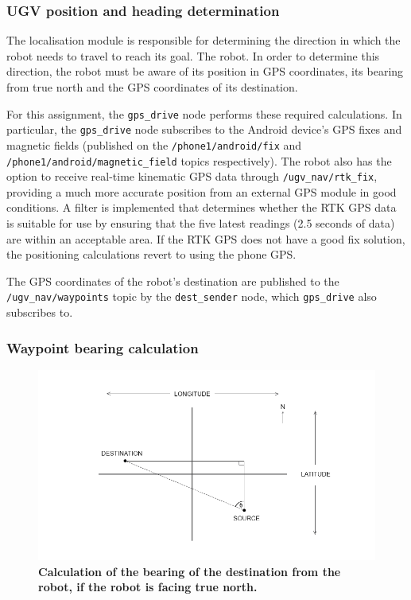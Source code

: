 \documentclass[titlepage,12pt,a4paper]{article}
\begin{document}
\subsubsection{UGV position and heading determination}
The localisation module is responsible for determining the direction in which the robot needs to travel to reach its goal. The robot. In order to determine this direction, the robot must be aware of its position in GPS coordinates, its bearing from true north and the GPS coordinates of its destination.

For this assignment, the \verb|gps_drive| node performs these required calculations. In particular, the \verb|gps_drive| node subscribes to the Android device's GPS fixes and magnetic fields (published on the \verb|/phone1/android/fix| and \verb|/phone1/android/magnetic_field| topics respectively). The robot also has the option to receive real-time kinematic GPS data through \verb|/ugv_nav/rtk_fix|, providing a much more accurate position from an external GPS module in good conditions. A filter is implemented that determines whether the RTK GPS data is suitable for use by ensuring that the five latest readings (2.5 seconds of data) are within an acceptable area. If the RTK GPS does not have a good fix solution, the positioning calculations revert to using the phone GPS.

The GPS coordinates of the robot's destination are published to the  \verb|/ugv_nav/waypoints| topic by the \verb|dest_sender| node, which \verb|gps_drive| also subscribes to.

\subsubsection{Waypoint bearing calculation}
\begin{figure}[h]
	\centering
	\includegraphics[scale=0.6]{figures/bearings.png}
	\caption{\textbf{Calculation of the bearing of the destination from the robot, if the robot is facing true north.}}
	\label{figure:bearing1}
\end{figure}
\end{document}
